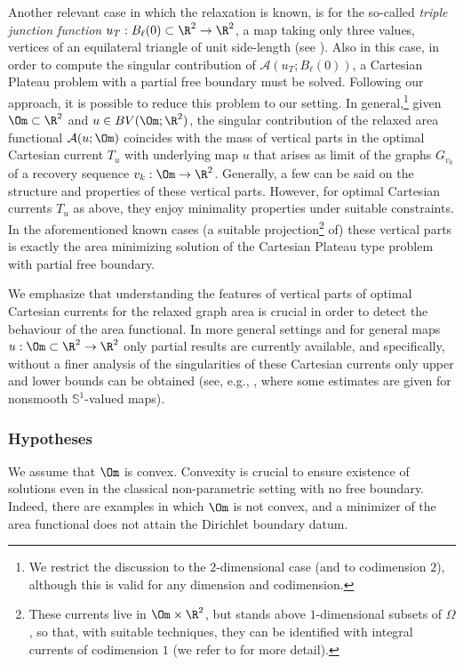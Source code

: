 Another relevant case in which the relaxation
is known, is for the so-called \textit{triple junction function}
$u_T:B_\ell(0)\subset\R^2\to \R^2$, a map taking only
three values, vertices of an equilateral triangle of unit side-length (see \cite{BePa:10,Scala:19}). Also in this case,
in order to compute the singular contribution of $\mathcal A(u_T;B_\ell(0))$, a Cartesian Plateau problem with a partial free boundary must be solved. Following our approach, it is possible to reduce this problem to our setting.
In general,\footnote{We restrict the discussion to the $2$-dimensional case (and to codimension $2$), although this is valid for any dimension and codimension.} given $\Om\subset \R^2$ and $u\in BV(\Om;\R^2)$, the singular contribution of the relaxed area functional $\mathcal A(u;\Om)$ coincides with the mass of vertical parts in the optimal Cartesian current $T_u$ with underlying map $u$ that arises as limit of the graphs $G_{v_k}$ of a recovery sequence $v_k:\Om\to \R^2$. Generally, a few can be said on the structure and properties of these vertical parts. However, for optimal Cartesian currents $T_u$ as above, they enjoy minimality properties under suitable constraints. In the aforementioned known cases (a suitable projection\footnote{These currents live in $\Om\times \R^2$, but stands above $1$-dimensional subsets of $\Omega$, so that, with suitable techniques, they can be identified with integral currents of codimension $1$ (we refer to \cite{BES1,BES2,BES3,BePa:10,Scala:19} for more detail).} of) these vertical parts is exactly the area minimizing solution of the Cartesian Plateau type problem with partial free boundary.

We emphasize that understanding the features of vertical parts of optimal Cartesian currents for the relaxed graph area is crucial in order to detect the behaviour of the area functional. In more general settings and for general maps $u:\Om\subset \R^2\to \R^2$
only partial results are currently available, and specifically, without a
finer analysis of the singularities of these Cartesian currents
only upper and lower bounds can be obtained
(see, e.g., \cite{BSS,ScSc}, where some estimates are given for nonsmooth $\mathbb S^1$-valued maps).

\subsubsection*{Hypotheses} We assume that $\Om$ is convex.
Convexity is crucial to ensure existence of solutions even
in the classical non-parametric setting with no free boundary.
Indeed, there are examples in which $\Om$ is not convex, and a
minimizer of the area functional does not attain the Dirichlet boundary datum.

